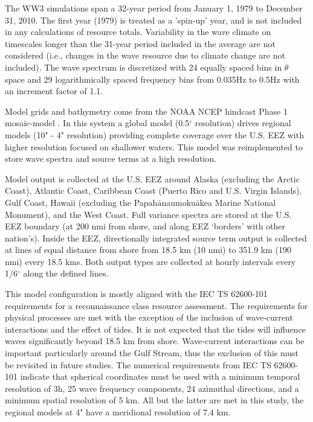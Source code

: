 The WW3 simulations span a 32-year period from January 1, 1979 to December 31, 2010. The first year (1979) is treated as a 'spin-up' year, and is not included in any calculations of resource totals. Variability in the wave climate on timescales longer than the 31-year period included in the average are not considered (i.e., changes in the wave resource due to climate change are not included). The wave spectrum is discretized with 24 equally spaced bins in $\theta$ space and 29 logarithmically spaced frequency bins from 0.035Hz to 0.5Hz with an increment factor of 1.1. 

Model grids and bathymetry come from the NOAA NCEP hindcast Phase 1 mosaic-model \citep{chawla2011wavewatch,chawla201230}. In this system a global model (0.5$^{\circ}$ resolution) drives regional models (10" - 4" resolution) providing complete coverage over the U.S. EEZ with higher resolution focused on shallower waters. This model was reimplemented to store wave spectra and source terms at a high resolution.

Model output is collected at the U.S. EEZ around Alaska (excluding the Arctic Coast), Atlantic Coast, Caribbean Coast (Puerto Rico and U.S. Virgin Islands), Gulf Coast, Hawaii (excluding the Papah$\bar{\text{a}}$naumoku$\bar{\text{a}}$kea Marine National Monument), and the West Coast. Full variance spectra are stored at the U.S. EEZ boundary (at 200 nmi from shore, and along EEZ `borders' with other nation's). Inside the EEZ, directionally integrated source term output is collected at lines of equal distance from shore from 18.5 km (10 nmi) to 351.9 km (190 nmi) every 18.5 kms. Both output types are collected at hourly intervals every 1/6$^{\circ}$ along the defined lines.

This model configuration is mostly aligned with the IEC TS 62600-101 requirements for a reconnaissance class resource assessment. The requirements for physical processes are met with the exception of the inclusion of wave-current interactions and the effect of tides. It is not expected that the tides will influence waves significantly beyond 18.5 km from shore. Wave-current interactions can be important particularly around the Gulf Stream, thus the exclusion of this must be revisited in future studies. The numerical requirements from IEC TS 62600-101 indicate that spherical coordinates must be used with a minimum temporal resolution of 3h, 25 wave frequency components, 24 azimuthal directions, and a minimum spatial resolution of 5 km. All but the latter are met in this study, the regional models at 4" have a meridional resolution of 7.4 km.

